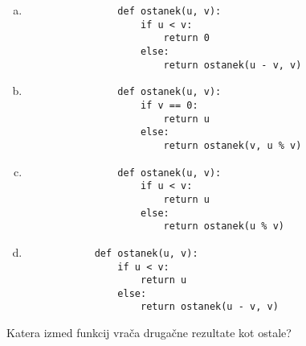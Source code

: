 \documentclass[arhiv, 10pt]{../izpit}
\begin{document}
        \begin{multicols}{2}
        \begin{enumerate}[(a)]
\item 
                \begin{verbatim}
                def ostanek(u, v):
                    if u < v:
                        return 0
                    else:
                        return ostanek(u - v, v)
                \end{verbatim}
            
\item 
                \begin{verbatim}
                def ostanek(u, v):
                    if v == 0:
                        return u
                    else:
                        return ostanek(v, u % v)
                \end{verbatim}
            
\item 
                \begin{verbatim}
                def ostanek(u, v):
                    if u < v:
                        return u
                    else:
                        return ostanek(u % v)
                \end{verbatim}
            
\item 
            \begin{verbatim}
            def ostanek(u, v):
                if u < v:
                    return u
                else:
                    return ostanek(u - v, v)
            \end{verbatim}
        
\end{enumerate}

        \end{multicols}
    
        \naloga*
        
        Katera izmed funkcij vrača drugačne rezultate kot ostale?
    
\end{document}
